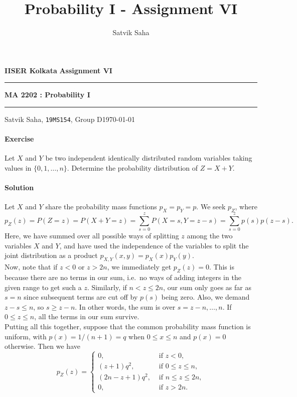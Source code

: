\documentclass[10pt]{article}
\title{Probability I - Assignment VI}
\author{Satvik Saha}
\date{}
\newcounter{prob}
\def\problem{\stepcounter{prob}\paragraph{Exercise \arabic{prob}}}
\def\solution{\paragraph{Solution}}
\begin{document}
        \par\textbf{IISER Kolkata} \hfill \textbf{Assignment VI}
        \vspace{3pt}
        \hrule
        \vspace{3pt}
        \begin{center}
                \LARGE{\textbf{MA 2202 : Probability I}}
        \end{center}
        \vspace{3pt}
        \hrule
        \vspace{3pt}
        Satvik Saha, \texttt{19MS154}, Group D\hfill\today
        \vspace{20pt}

        \problem Let $X$ and $Y$ be two independent identically distributed random
        variables taking values in $\{0, 1, \dots, n\}$. Determine the probability
        distribution of $Z = X + Y$.

        \solution Let $X$ and $Y$ share the probability mass functions $p_X = p_Y =
        p$. We seek $p_Z$, where \[
            p_Z(z) = P(Z = z) = P(X + Y = z) = \sum_{s = 0}^{z} P(X = s, Y = z - s)
            = \sum_{s = 0}^z p(s)p(z - s).
        \] Here, we have summed over all possible ways of splitting $z$ among the
        two variables $X$ and $Y$, and have used the independence of the variables
        to split the joint distribution as a product $p_{X,Y}(x, y) = p_X(x)p_Y(y)$.
        \\

        Now, note that if $z < 0$ or $z > 2n$, we immediately get $p_Z(z) = 0$. This
        is because there are no terms in our sum, i.e.\ no ways of adding integers
        in the given range to get such a $z$. Similarly, if $n < z \leq 2n$, our sum
        only goes as far as $s = n$ since subsequent terms are cut off by $p(s)$
        being zero. Also, we demand $z - s \leq n$, so $s \geq z - n$. In other
        words, the sum is over $s = z - n, \dots, n$. If $0 \leq z \leq n$, all the
        terms in our sum survive. \\

        Putting all this together, suppose that the common probability mass function is
        uniform, with $p(x) = 1 / (n + 1) = q$ when $0 \leq x \leq n$ and $p(x) = 0$
        otherwise. Then we have \[
            p_Z(z) = \begin{cases}
                0, &\text{ if } z < 0, \\
                (z + 1)q^2, &\text{ if }0 \leq z \leq n, \\
                (2n - z + 1)q^2, &\text{ if } n \leq z \leq 2n, \\
                0, &\text{ if } z > 2n.
            \end{cases}
        \] 
\end{document}
